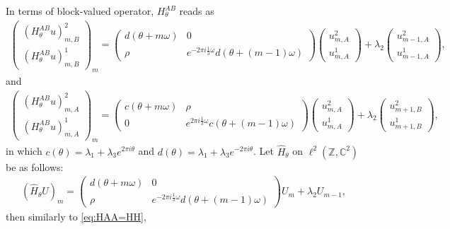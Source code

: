\documentclass[11pt]{amsart}
\newcommand{\Z}{\mathbb Z}
\newcommand{\C}{\mathbb C}
\begin{document}
In terms of block-valued operator, $H_{\theta}^{AB}$ reads as
\begin{align}
    \left(\begin{matrix}(H^{AB}_{\theta}u)_{m,B}^2\\ (H^{AB}_{\theta}u)_{m,B}^1\end{matrix}\right)_m=
    \left(\begin{matrix}
d(\theta+m\omega) &0\\
\rho &e^{-2\pi i\frac{1}{3}\omega}d(\theta+(m-1)\omega)
    \end{matrix}\right)\left(\begin{matrix}
        u_{m,A}^2\\ u_{m,A}^1
    \end{matrix}\right)
+\lambda_2\left(\begin{matrix}
    u_{m-1,A}^2\\ u_{m-1,A}^1
    \end{matrix}\right),
\end{align}
and
\begin{align}
\left(\begin{matrix}(H^{AB}_{\theta}u)_{m,A}^2\\ (H^{AB}_{\theta}u)_{m,A}^1\end{matrix}\right)_m=
    \left(\begin{matrix}
c(\theta+m\omega) &\rho\\
0 &e^{2\pi i\frac{1}{3}\omega}c(\theta+(m-1)\omega)
    \end{matrix}\right)\left(\begin{matrix}
        u_{m,A}^2\\ u_{m,A}^1
    \end{matrix}\right)
+\lambda_2\left(\begin{matrix}
    u_{m+1,B}^2\\ u_{m+1,B}^1
    \end{matrix}\right),
\end{align}
in which $c(\theta)=\lambda_1+\lambda_3 e^{2\pi i\theta}$ and $d(\theta)=\lambda_1+\lambda_3 e^{-2\pi i\theta}$.
Let $\widehat{H}_{\theta}$ on $\ell^2(\Z, \C^2)$ be as follows:
\begin{align}
    (\widehat{H}_{\theta}U)_m=\left(\begin{matrix}
d(\theta+m\omega) &0\\
\rho &e^{-2\pi i\frac{1}{3}\omega}d(\theta+(m-1)\omega)
    \end{matrix}\right)U_m+\lambda_2 U_{m-1},
\end{align}
then similarly to \eqref{eq:HAA=HH}, 
\end{document}
